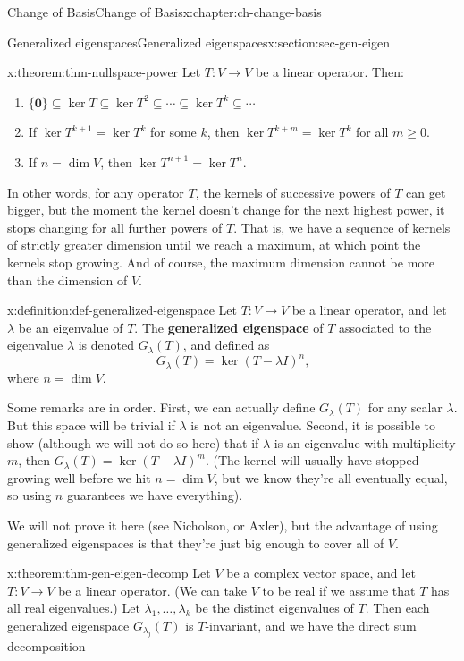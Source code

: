 \documentclass[oneside,10pt,]{book}
\newcommand{\terminology}[1]{\textbf{#1}}
\numberwithin{equation}{section}
\newcommand{\zer}{\mathbf{0}}
\begin{document}
\begin{chapterptx}{Change of Basis}{}{Change of Basis}{}{}{x:chapter:ch-change-basis}
\begin{sectionptx}{Generalized eigenspaces}{}{Generalized eigenspaces}{}{}{x:section:sec-gen-eigen}
\begin{theorem}{}{}{x:theorem:thm-nullspace-power}%
Let \(T:V\to V\) be a linear operator. Then:%
\begin{enumerate}
\item{}\(\displaystyle \{\zer\}\subseteq \ker T \subseteq \ker T^2 \subseteq \cdots \subseteq \ker T^k\subseteq \cdots\)%
\item{}If \(\ker T^{k+1}=\ker T^k\) for some \(k\), then \(\ker T^{k+m}=\ker T^k\) for all \(m\geq 0\).%
\item{}If \(n=\dim V\), then \(\ker T^{n+1} = \ker T^n\).%
\end{enumerate}
%
\end{theorem}
In other words, for any operator \(T\), the kernels of successive powers of \(T\) can get bigger, but the moment the kernel doesn't change for the next highest power, it stops changing for all further powers of \(T\). That is, we have a sequence of kernels of strictly greater dimension until we reach a maximum, at which point the kernels stop growing. And of course, the maximum dimension cannot be more than the dimension of \(V\).%
\begin{definition}{}{x:definition:def-generalized-eigenspace}%
Let \(T:V\to V\) be a linear operator, and let \(\lambda\) be an eigenvalue of \(T\). The \terminology{generalized eigenspace} of \(T\) associated to the eigenvalue \(\lambda\) is denoted \(G_\lambda(T)\), and defined as%
\begin{equation*}
G_\lambda(T) = \ker (T-\lambda I)^n\text{,}
\end{equation*}
where \(n=\dim V\).%
\end{definition}
Some remarks are in order. First, we can actually define \(G_\lambda(T)\) for any scalar \(\lambda\). But this space will be trivial if \(\lambda\) is not an eigenvalue. Second, it is possible to show (although we will not do so here) that if \(\lambda\) is an eigenvalue with multiplicity \(m\), then \(G_\lambda(T)=\ker (T-\lambda I)^m\). (The kernel will usually have stopped growing well before we hit \(n=\dim V\), but we know they're all eventually equal, so using \(n\) guarantees we have everything).%
\par
We will not prove it here (see Nicholson, or Axler), but the advantage of using generalized eigenspaces is that they're just big enough to cover all of \(V\).%
\begin{theorem}{}{}{x:theorem:thm-gen-eigen-decomp}%
Let \(V\) be a complex vector space, and let \(T:V\to V\) be a linear operator. (We can take \(V\) to be real if we assume that \(T\) has all real eigenvalues.) Let \(\lambda_1,\ldots, \lambda_k\) be the distinct eigenvalues of \(T\). Then each generalized eigenspace \(G_{\lambda_j}(T)\) is \(T\)-invariant, and we have the direct sum decomposition%

\end{theorem}
\end{sectionptx}
\end{chapterptx}
\end{document}

